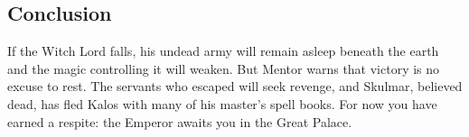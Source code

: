 \subsection*{Conclusion}
If the Witch Lord falls, his undead army will remain asleep beneath the earth and the magic controlling it will weaken. But Mentor warns that victory is no excuse to rest. The servants who escaped will seek revenge, and Skulmar, believed dead, has fled Kalos with many of his master's spell books. For now you have earned a respite: the Emperor awaits you in the Great Palace.
